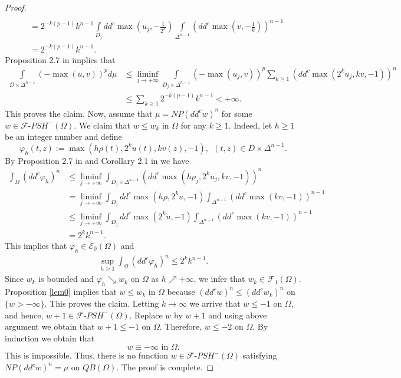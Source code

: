 \documentclass[3p,times]{elsarticle}
\numberwithin{equation}{section}
\newtheorem{The main theorem}[theorem]{The main theorem}
\theoremstyle{definition}
\begin{document}
\begin{proof}
\begin{align*}
\\& = 2^{-k(p-1)} k^{n-1}  \int\limits_{D_j  } dd^c  \max (  u_j  , - \frac{1}{2^{k}})    \int\limits_{ \Delta ^{n-1}}  (dd^c  \max (  v  , - \frac{1}{k}) )^{n-1} 
\\& = 2^{-k(p-1)} k^{n-1} . 
\end{align*}
Proposition 2.7 in \cite{TVH} implies that 
\begin{align*}
 \int\limits_{D \times \Delta ^{n-1}} (- \max(u,v))^p d \mu 
& \leq  \liminf_{j\to+\infty} \int\limits_{D_j  \times \Delta ^{n-1}} (- \max(u_j,v) )^p \sum_{k\geq 1}(dd^c \max(2^k u_j , k v,-1) )^{n}  
\\
& \leq \sum_{k\geq 1} 2^{-k(p-1)} k^{n-1} <+\infty. 
\end{align*}
This proves the claim. 
Now, assume that $\mu = NP(dd^c w)^n$ for some $w \in\mathcal  F \text{-} PSH^-(\Omega)$. 
We claim that $w\leq w_k$ in $\Omega$ for any $k\geq 1$. Indeed, let $h\geq 1$ be an integer number and define 
$$
\varphi_h(t,z) :=  \max(h\rho(t), 2^k u(t),   kv(z),-1)   , \ \ (t,z) \in D \times \Delta^{n-1}.
$$
By Proposition 2.7 in \cite{TVH} and  Corollary 2.1 in \cite{ACH}    we have 
\begin{align*}
\int_\Omega (dd^c \varphi_h)^n 
& \leq \liminf_{j\to +\infty} \int _{D_j \times \Delta^{n-1}} (dd^c \max(h\rho_j  , 2^k u_j ,  kv ,-1)  )^{n}  
\\ & =    \liminf_{j\to +\infty} \int _{D_j  }  dd^c \max(h\rho, 2^k u  ,-1)  \int _{ \Delta^{n-1}} (dd^c \max( kv ,-1) )^{n-1}  
\\ & \leq    \liminf_{j\to +\infty} \int _{D_j  }  dd^c \max( 2^k u  ,-1)  \int _{ \Delta^{n-1}} (dd^c \max( kv ,-1) )^{n-1}  
\\& = 2^k k^{n-1}. 
\end{align*}
This implies that $\varphi_h \in \mathcal E_0 (\Omega)$ and
\begin{align*}
\sup_{h\geq 1} \int_\Omega (dd^c \varphi_h)^n  
\leq  2^k k^{n-1}. 
\end{align*}
Since $w_k$ is bounded and $\varphi_h \searrow w_k$ on $\Omega$ as $h \nearrow+\infty$, we infer that   $w_k \in \mathcal F_1 (\Omega)$. 
Proposition \ref{lem0} implies that   
$w\leq w_k \text{ in } \Omega$
because $(dd^c w)^n \leq (dd^c w_k)^n $ on $\{w>-\infty\}$. 
This proves the claim.  
Letting $k\to\infty$ we arrive that $w \leq -1 $ on $\Omega$, and hence,  $w +1\in \mathcal  F \text{-} PSH^- (\Omega)$. Replace $w$ by $w+1$ and using above argument we obtain that 
$w +1 \leq -1 \text{ on } \Omega.$
Therefore,  $w \leq -2 $ on $\Omega$. By induction we obtain that  
$$
w\equiv -\infty \text{ in } \Omega .
$$
This is impossible.  Thus, there is no function $w\in\mathcal  F \text{-} PSH^-(  \Omega )$ satisfying $NP(dd^c w)^n=\mu$ on $QB( \Omega)$. The proof is complete. 
\end{proof}
\end{document}
